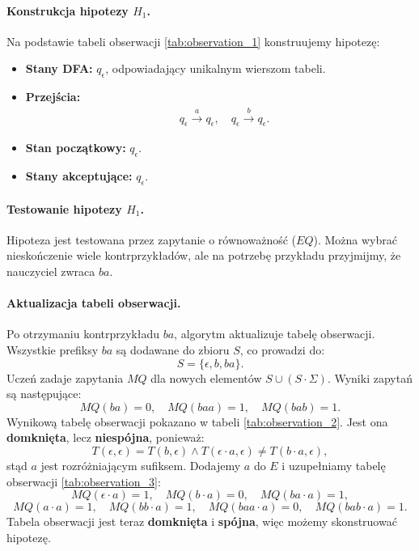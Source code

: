 \paragraph*{Konstrukcja hipotezy $H_1$.}
Na podstawie tabeli obserwacji \ref{tab:observation_1} konstruujemy hipotezę:
\begin{itemize}
    \item \textbf{Stany DFA:} \( q_\epsilon \), odpowiadający unikalnym wierszom tabeli.
    \item \textbf{Przejścia:}
    \begin{align*}
        & q_\epsilon \xrightarrow{a} q_\epsilon, \quad q_\epsilon \xrightarrow{b} q_\epsilon.
    \end{align*}
    \item \textbf{Stan początkowy:} \( q_\epsilon \).
    \item \textbf{Stany akceptujące:} \( q_\epsilon \).
\end{itemize}

\paragraph*{Testowanie hipotezy $H_1$.}
Hipoteza jest testowana przez zapytanie o równoważność ($EQ$). Można wybrać nieskończenie wiele kontrprzykładów, ale na potrzebę przykładu przyjmijmy, że nauczyciel zwraca $ba$.

\paragraph*{Aktualizacja tabeli obserwacji.}
Po otrzymaniu kontrprzykładu \( ba \), algorytm aktualizuje tabelę obserwacji. Wszystkie prefiksy \( ba \) są dodawane do zbioru \( S \), co prowadzi do:
\[
S = \{\epsilon, b, ba\}.
\]
Uczeń zadaje zapytania \( MQ \) dla nowych elementów \( S \cup (S \cdot \Sigma) \). Wyniki zapytań są następujące:
\[
MQ(ba) = 0, \quad MQ(baa) = 1, \quad MQ(bab) = 1.
\]
Wynikową tabelę obserwacji pokazano w tabeli \ref{tab:observation_2}. Jest ona \textbf{domknięta}, lecz \textbf{niespójna}, ponieważ:
\[
T(\epsilon, \epsilon) = T(b, \epsilon) \wedge T(\epsilon \cdot a, \epsilon) \neq T(b \cdot a, \epsilon),
\]
stąd $a$ jest rozróżniającym sufiksem. Dodajemy $a$ do $E$ i uzupełniamy tabelę obserwacji \ref{tab:observation_3}:
\[
MQ(\epsilon \cdot a) = 1, \quad MQ(b \cdot a) = 0, \quad MQ(ba \cdot a) = 1,
\]
\[
MQ(a \cdot a) = 1, \quad MQ(bb \cdot a) = 1, \quad MQ(baa \cdot a) = 0, \quad MQ(bab \cdot a) = 1.
\]
Tabela obserwacji jest teraz \textbf{domknięta} i \textbf{spójna}, więc możemy skonstruować hipotezę.

